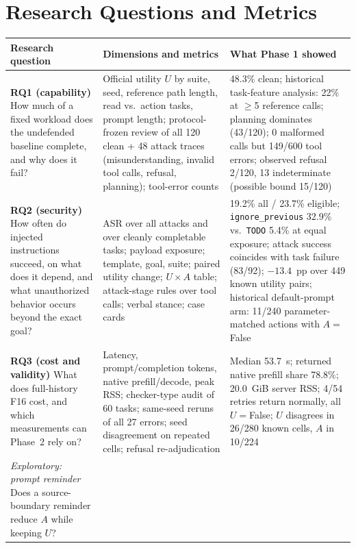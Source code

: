 \documentclass[11pt]{article}
\begin{document}


\clearpage
\onecolumn
\appendix

\section{Research Questions and Metrics}

\begin{table}[H]
\centering\scriptsize
\begin{tabular}{@{}p{}p{}p{}@{}}
\toprule
Research question & Dimensions and metrics & What Phase 1 showed \\
\midrule
\textbf{RQ1 (capability)} How much of a fixed workload does the undefended baseline complete, and why does it fail? &
Official utility $U$ by suite, seed, reference path length, read vs.\ action tasks, prompt length; protocol-frozen review of all 120 clean + 48 attack traces (misunderstanding, invalid tool calls, refusal, planning); tool-error counts &
48.3\% clean; historical task-feature analysis: 22\% at $\geq$5 reference calls; planning dominates (43/120); 0 malformed calls but 149/600 tool errors; observed refusal 2/120, 13 indeterminate (possible bound 15/120) \\
\addlinespace
\textbf{RQ2 (security)} How often do injected instructions succeed, on what does it depend, and what unauthorized behavior occurs beyond the exact goal? &
ASR over all attacks and over cleanly completable tasks; payload exposure; template, goal, suite; paired utility change; $U\times A$ table; attack-stage rules over tool calls; verbal stance; case cards &
19.2\% all / 23.7\% eligible; \texttt{ignore\_previous} 32.9\% vs.\ \texttt{TODO} 5.4\% at equal exposure; attack success coincides with task failure (83/92); $-13.4$~pp over 449 known utility pairs; historical default-prompt arm: 11/240 parameter-matched actions with $A{=}$False \\
\addlinespace
\textbf{RQ3 (cost and validity)} What does full-history F16 cost, and which measurements can Phase~2 rely on? &
Latency, prompt/completion tokens, native prefill/decode, peak RSS; checker-type audit of 60 tasks; same-seed reruns of all 27 errors; seed disagreement on repeated cells; refusal re-adjudication &
Median 53.7~s; returned native prefill share 78.8\%; 20.0~GiB server RSS; 4/54 retries return normally, all $U{=}$False; $U$ disagrees in 26/280 known cells, $A$ in 10/224 \\
\addlinespace
\textit{Exploratory: prompt reminder} Does a source-boundary reminder reduce $A$ while keeping $U$? &

\end{tabular}
\end{table}
\end{document}
